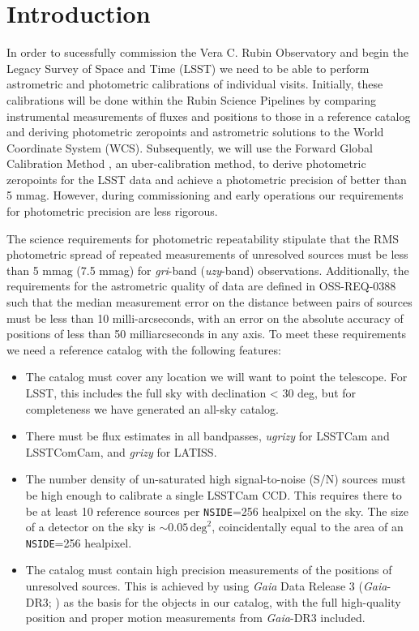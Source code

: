 \section{Introduction}
In order to sucessfully commission the Vera C. Rubin Observatory and begin the Legacy Survey of Space and Time (LSST) we need to be able to perform astrometric and photometric calibrations of individual visits.
Initially, these calibrations will be done within the Rubin Science Pipelines by comparing instrumental measurements of fluxes and positions to those in a reference catalog and deriving photometric zeropoints and astrometric solutions to the World Coordinate System (WCS).
Subsequently, we will use the Forward Global Calibration Method \citep[FGCM;][]{Burke:2018}, an uber-calibration method, to derive photometric zeropoints for the LSST data and achieve a photometric precision of better than 5 mmag.
However, during commissioning and early operations our requirements for photometric precision are less rigorous.

The science requirements for photometric repeatability \citep[OSS-REQ-0387;][]{LSE-30} stipulate that the RMS photometric spread of repeated measurements of unresolved sources must be less than 5 mmag (7.5 mmag) for \emph{gri}-band (\emph{uzy}-band) observations.
Additionally, the requirements for the astrometric quality of data are defined in OSS-REQ-0388 such that the median measurement error on the distance between pairs of sources must be less than 10 milli-arcseconds, with an error on the absolute accuracy of positions of less than 50 milliarcseconds in any axis.
To meet these requirements we need a reference catalog with the following features:

\begin{itemize}
    \item The catalog must cover any location we will want to point the telescope.
    For LSST, this includes the full sky with declination < 30 deg, but for completeness we have generated an all-sky catalog.
    \item There must be flux estimates in all bandpasses, \textit{ugrizy} for LSSTCam and LSSTComCam, and \textit{grizy} for LATISS.
    \item The number density of un-saturated high signal-to-noise (S/N) sources must be high enough to calibrate a single LSSTCam CCD.
    This requires there to be at least 10 reference sources per \texttt{NSIDE}=256 healpixel on the sky.
    The size of a detector on the sky is $\sim 0.05\,\mathrm{deg}^2$, coincidentally equal to the area of an \texttt{NSIDE}=256 healpixel.
    \item The catalog must contain high precision measurements of the positions of unresolved sources.
    This is achieved by using \textit{Gaia} Data Release 3 (\emph{Gaia}-DR3; \citealt{GaiaCollaboration:2023-DR3}) as the basis for the objects in our catalog, with the full high-quality position and proper motion measurements from \textit{Gaia}-DR3 included.
\end{itemize}

